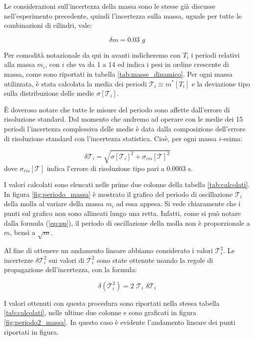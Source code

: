 Le considerazioni sull'incertezza della massa sono le stesse già discusse nell'esperimento precedente,
quindi l'incertezza sulla massa, uguale per tutte le combinazioni di cilindri, vale:

\begin{equation*}
    \delta m = 0.03 \,\, g
\end{equation*}

Per comodità notazionale da qui in avanti indicheremo con $T_i$ i periodi relativi alla massa $m_i$, con $i$ che va da 1 a 14 ed
indica i pesi in ordine crescente di massa, come sono riportati in tabella \ref{tab:masse_dinamico}.
Per ogni massa utilizzata, è stata calcolata la media dei periodi $\mathcal{T}_i \equiv m^*[T_i]$ e la deviazione tipo sulla distribuzione
delle medie $\sigma[\mathcal{T}_i]$.

È doveroso notare che tutte le misure del periodo sono affette dall'errore di risoluzione standard.
Dal momento che andremo ad operare con le medie dei 15 periodi l'incertezza complessiva delle medie è data dalla composizione
dell'errore di risoluzione standard con l'incertezza statistica. Cioè, per ogni massa $i$-esima:

\begin{equation*}
    \delta \mathcal{T}_i = \sqrt{\sigma[\mathcal{T}_i]^2 + \sigma_{ris}[\mathcal{T}]^2}
\end{equation*}
%
dove $\sigma_{ris}[\mathcal{T}]$ indica l'errore di risoluzione tipo pari a 0.0003 s.

I valori calcolati sono elencati nelle prime
due colonne della tabella \ref{tab:calcolati}.
In figura \ref{fig:periodo_massa} è mostrato il grafico del periodo di oscillazione $\mathcal{T}_i$ della molla al variare della massa $m_i$ ad essa appesa. Si vede chiaramente
che i punti sul grafico non sono allineati lungo una retta. Infatti, come si può notare dalla formula (\ref{eq:pp}),
il periodo di oscillazione della molla non è proporzionale a $m$, bensì a $\sqrt{m}$.

Al fine di ottenere un andamento lineare abbiamo considerato i valori $\mathcal{T}_i^2$. Le incertezze $\delta \mathcal{T}_i^2$
sui valori di $\mathcal{T}_i^2$ sono state ottenute usando la regole di propagazione dell'incertezza, con la formula:

\begin{equation*}
    \delta(\mathcal{T}_i^2) = 2 \,\, \mathcal{T}_i \,\, \delta \mathcal{T}_i
\end{equation*}

I valori ottenuti con questa procedura sono riportati nella stessa tabella \ref{tab:calcolati}, nelle ultime due colonne e sono
graficati in figura \ref{fig:periodo2_massa}. In questo caso è evidente l'andamento lineare dei punti riportati in figura.


